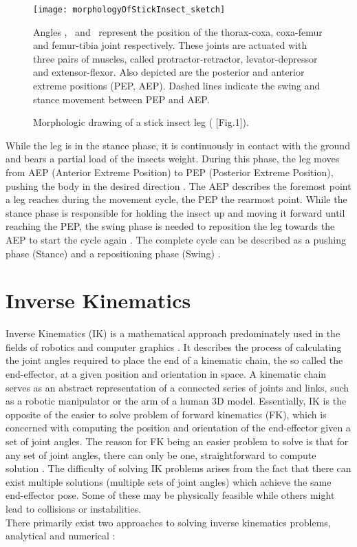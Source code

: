 \begin{figure}[h]
	\centerline{\texttt{[image: morphologyOfStickInsect\_sketch]}}
	\caption{Morphologic drawing of a stick insect leg (\cite{schilling2013walknet} [Fig.1]).}
	\begin{footnotesize}
		Angles \textalpha, \textbeta \ and \textgamma \ represent the position of the thorax-coxa, coxa-femur and femur-tibia joint respectively.
		These joints are actuated with three pairs of muscles, called protractor-retractor, levator-depressor and extensor-flexor.
		Also depicted are the posterior and anterior extreme positions (PEP, AEP).
		Dashed lines indicate the swing and stance movement between PEP and AEP.
	\end{footnotesize}
	
	\label{figure: Stick insect leg}
\end{figure}

While the leg is in the stance phase, it is continuously in contact with the ground and bears a partial load of the insects weight.
During this phase, the leg moves from AEP (Anterior Extreme Position) to PEP (Posterior Extreme Position), pushing the body in the desired direction \parencite{schilling2013walknet}.
The AEP describes the foremost point a leg reaches during the movement cycle, the PEP the rearmost point.
While the stance phase is responsible for holding the insect up and moving it forward until reaching the PEP, the swing phase is needed to reposition the leg towards the AEP to start the cycle again \parencite{schilling2013walknet}.
The complete cycle can be described as a pushing phase (Stance) and a repositioning phase (Swing) .



\section{Inverse Kinematics}
Inverse Kinematics (IK) is a mathematical approach predominately used in the fields of robotics and computer graphics \parencite{AristidouFABRIK}.
It describes the process of calculating the joint angles required to place the end of a kinematic chain, the so called the end-effector, at a given position and orientation in space.
A kinematic chain serves as an abstract representation of a connected series of joints and links, such as a robotic manipulator or the arm of a human 3D model.
Essentially, IK is the opposite of the easier to solve problem of forward kinematics (FK), which is concerned with computing the position and orientation of the end-effector given a set of joint angles.
The reason for FK being an easier problem to solve is that for any set of joint angles, there can only be one, straightforward to compute solution \parencite{inverseKinematicsIllinois}.
The difficulty of solving IK problems arises from the fact that there can exist multiple solutions (multiple sets of joint angles) which achieve the same end-effector pose.
Some of these may be physically feasible while others might lead to collisions or instabilities.\\
There primarily exist two approaches to solving inverse kinematics problems, analytical and numerical \parencite{inverseKinematicsIllinois}:

